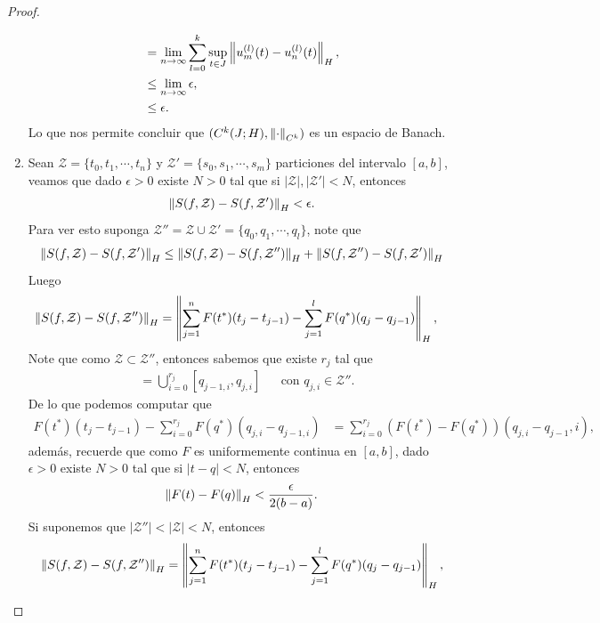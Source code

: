 \begin{proof}
\begin{enumerate}
\begin{align*}
        &=\lim_{n \to \infty}\sum_{l=0}^{k}\sup_{t\in J}\left\|u_{m}^{(l)}(t)-u_{n}^{(l)}(t)\right\|_{H},\\
        &\leq\lim_{n \to \infty}\epsilon,\\
        &\leq \epsilon.
      \end{align*}
      Lo que nos permite concluir que $(C^{k}(J;H),\left\|\cdot\right\|_{C^{k}})$ es un espacio de Banach.
    \item Sean $\mathcal{Z}=\{t_0,t_{1},\cdots,t_{n}\}$ y $\mathcal{Z}'=\{s_0,s_{1},\cdots,s_{m}\}$ particiones del intervalo $[a,b]$, veamos que dado $\epsilon>0$ existe $N>0$ tal que si $|\mathcal{Z}|,|\mathcal{Z}'|< N$, entonces 
    \begin{align*}
      \left\|S(f,\mathcal{Z})-S(f,\mathcal{Z}')\right\|_{H}<\epsilon. 
    \end{align*}
    Para ver esto suponga $\mathcal{Z}''=\mathcal{Z}\cup\mathcal{Z}'=\{q_{0},q_{1},\cdots,q_{l}\}$, note que
    \begin{align*}
      \left\|S(f,\mathcal{Z})-S(f,\mathcal{Z}')\right\|_{H}\leq\left\|S(f,\mathcal{Z})-S(f,\mathcal{Z}'')\right\|_{H}+\left\|S(f,\mathcal{Z''})-S(f,\mathcal{Z}')\right\|_{H}
    \end{align*}
    Luego
    \begin{align*}
      \left\|S(f,\mathcal{Z})-S(f,\mathcal{Z''})\right\|_{H}&=\left\|\sum_{j=1}^{n}F(t^{*})(t_{j}-t_{j-1})-\sum_{j=1}^{l}F(q^{*})(q_{j}-q_{j-1})\right\|_{H},
    \end{align*}
    Note que como $\mathcal{Z}\subset \mathcal{Z}''$, entonces sabemos que existe $r_{j}$ tal que
    \begin{align*}
      [t_{j-1},t_{j}]&=\bigcup_{i=0}^{r_{j}} [q_{j-1,i},q_{j,i}] &&\text{con $q_{j,i}\in \mathcal{Z}''$.}
    \end{align*}
    De lo que podemos computar que
    \begin{align*}
      F(t^{*})(t_{j}-t_{j-1})-\sum_{i=0}^{r_{j}}F(q^*)(q_{j,i}-q_{j-1,i})&=\sum_{i=0}^{r_{j}}(F(t^*)-F(q^*))(q_{j,i}-q_{j-1},i),
    \end{align*}
    además, recuerde que como $F$ es uniformemente continua en $[a,b]$, dado $\epsilon>0$ existe $N>0$ tal que si $|t-q|<N$, entonces
    \begin{align*}
      \left\|F(t)-F(q)\right\|_{H}< \frac{\epsilon}{2(b-a)}. 
    \end{align*}
    Si suponemos que $|\mathcal{Z}''|<|\mathcal{Z}|<N$, entonces
    \begin{align*}
      \norm{S(f,\mathcal{Z})-S(f,\mathcal{Z''})}_{H}&=\norm{\sum_{j=1}^{n}F(t^{*})(t_{j}-t_{j-1})-\sum_{j=1}^{l}F(q^{*})(q_{j}-q_{j-1})}_{H},\\

\end{align*}
\end{enumerate}
\end{proof}
